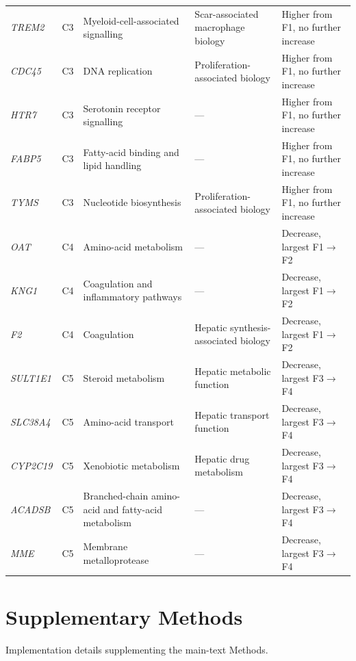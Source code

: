 \documentclass[10pt,a4paper]{article}
\begin{document}
\begin{table}[p]
{\begin{tabularx}{\linewidth}{@{}l c >{\raggedright\arraybackslash}X >{\raggedright\arraybackslash}X >{\raggedright\arraybackslash}p{3.6cm}@{}}
\textit{TREM2} & C3 & Myeloid-cell-associated signalling & Scar-associated macrophage biology & Higher from F1, no further increase \\
\textit{CDC45} & C3 & DNA replication & Proliferation-associated biology & Higher from F1, no further increase \\
\textit{HTR7} & C3 & Serotonin receptor signalling & --- & Higher from F1, no further increase \\
\textit{FABP5} & C3 & Fatty-acid binding and lipid handling & --- & Higher from F1, no further increase \\
\textit{TYMS} & C3 & Nucleotide biosynthesis & Proliferation-associated biology & Higher from F1, no further increase \\
\textit{OAT} & C4 & Amino-acid metabolism & --- & Decrease, largest F1$\rightarrow$F2 \\
\textit{KNG1} & C4 & Coagulation and inflammatory pathways & --- & Decrease, largest F1$\rightarrow$F2 \\
\textit{F2} & C4 & Coagulation & Hepatic synthesis-associated biology & Decrease, largest F1$\rightarrow$F2 \\
\textit{SULT1E1} & C5 & Steroid metabolism & Hepatic metabolic function & Decrease, largest F3$\rightarrow$F4 \\
\textit{SLC38A4} & C5 & Amino-acid transport & Hepatic transport function & Decrease, largest F3$\rightarrow$F4 \\
\textit{CYP2C19} & C5 & Xenobiotic metabolism & Hepatic drug metabolism & Decrease, largest F3$\rightarrow$F4 \\
\textit{ACADSB} & C5 & Branched-chain amino-acid and fatty-acid metabolism & --- & Decrease, largest F3$\rightarrow$F4 \\
\textit{MME} & C5 & Membrane metalloprotease & --- & Decrease, largest F3$\rightarrow$F4 \\
\bottomrule
\end{tabularx}}
\par{}
\end{table}

\clearpage
\section*{Supplementary Methods}
Implementation details supplementing the main-text Methods.
\end{document}
